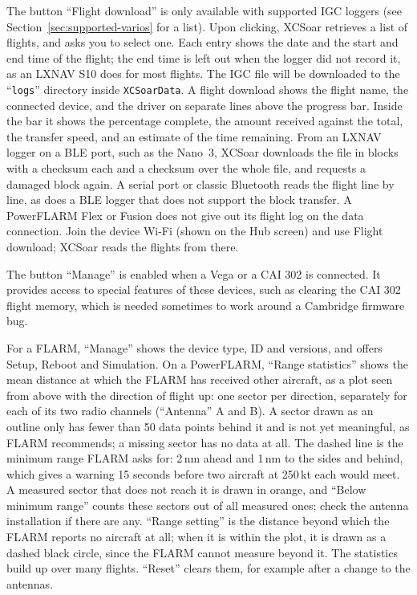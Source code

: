 The button ``Flight download'' is only available with supported IGC
loggers (see Section~\ref{sec:supported-varios} for a list).  Upon clicking,
XCSoar retrieves a list of flights, and asks you to select one.  Each
entry shows the date and the start and end time of the flight; the end
time is left out when the logger did not record it, as an LXNAV S10
does for most flights.  The
IGC file will be downloaded to the ``\texttt{logs}'' directory inside
\texttt{XCSoarData}.  A flight download shows the flight name, the connected device, and the
driver on separate lines above the progress bar.  Inside the bar it
shows the percentage complete, the amount received against the total,
the transfer speed, and an estimate of the time remaining.
From an LXNAV logger on a BLE port, such as the Nano~3, XCSoar
downloads the file in blocks with a checksum each and a checksum over
the whole file, and requests a damaged block again.  A serial port or
classic Bluetooth reads the flight line by line, as does a BLE logger
that does not support the block transfer.
A PowerFLARM Flex or Fusion does not give out its flight log on the
data connection.  Join the device Wi-Fi (shown on the Hub screen) and
use Flight download; XCSoar reads the flights from there.

The button ``Manage'' is enabled when a Vega or a CAI 302 is
connected.  It provides access to special features of these devices,
such as clearing the CAI 302 flight memory, which is needed sometimes
to work around a Cambridge firmware bug.

For a FLARM, ``Manage'' shows the device type, ID and versions, and
offers Setup, Reboot and Simulation.  On a PowerFLARM, ``Range
statistics'' shows the mean distance at which the FLARM has received
other aircraft, as a plot seen from above with the direction of flight
up: one sector per direction, separately for each of its two radio
channels (``Antenna'' A and B).  A sector drawn as an outline only has
fewer than 50 data points behind it and is not yet meaningful, as
FLARM recommends; a missing sector has no data at all.  The dashed
line is the minimum range FLARM asks for: 2\,nm ahead and 1\,nm to
the sides and behind, which gives a warning 15 seconds before two
aircraft at 250\,kt each would meet.  A measured sector that does not
reach it is drawn in orange, and ``Below minimum range'' counts these
sectors out of all measured ones; check the antenna installation if
there are any.  ``Range setting'' is the distance beyond which the
FLARM reports no aircraft at all; when it is within the plot, it is
drawn as a dashed black circle, since the FLARM cannot measure beyond
it.  The statistics build up over many flights.  ``Reset''
clears them, for example after a change to the antennas.


